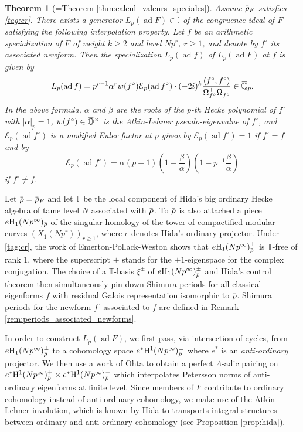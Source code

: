 \documentclass[12pt]{amsart}
\newcommand\bI{\mathbb{I}}
\newcommand\bQ{\mathbb{Q}}
\newcommand\bT{\mathbb{T}}
\newcommand\cE{\mathcal{E}}
\newcommand{\ob}[1]{\mkern 1.5mu\overline{\mkern-1.5mu#1\mkern-1.5mu}\mkern 1.5mu}
\DeclareMathOperator{\ad}{ad}
\newcommand{\HH}{\mathrm{H}}
\theoremstyle{defstyle}
\theoremstyle{thmstyle}
\newtheorem{THM}{Theorem}
\begin{document}
\begin{THM}[=Theorem \ref{thm:calcul_valeurs_speciales}]\label{thm:introduction_main_1}
	Assume $\ob{\rho}_F$ satisfies \eqref{tag:cr}. There exists a generator $L_p(\ad F)\in\bI$ of the congruence ideal of $F$ satisfying the following interpolation property. Let $f$ be an arithmetic specialization of $F$ of weight $k\geq 2$ and level $Np^r$, $r\geq 1$, and denote by $f^\circ$ its associated newform. Then the specialization $L_p(\ad f)$ of $L_p(\ad F)$ at $f$ is given by
	\begin{equation*}
		L_p(\ad f)=p^{r-1}\alpha^r w(f^\circ)\cE_p(\ad f^\circ)\cdot (-2i)^{k} \dfrac{\langle f^\circ,f^\circ\rangle}{\Omega^+_{f^\circ}\Omega^-_{f^\circ}}\in\ob{\bQ}_p.
	\end{equation*}
	In the above formula, $\alpha$ and $\beta$ are the roots of the $p$-th Hecke polynomial of $f^\circ$ with $|\alpha|_p=1$, $w(f^\circ)\in \ob{\bQ}^\times$ is the Atkin-Lehner pseudo-eigenvalue of $f^\circ$, and $\cE_p(\ad f^\circ)$ is a modified Euler factor at $p$ given by $\cE_p(\ad f^\circ)=1$ if $f^\circ= f$ and by \[\cE_p(\ad f^\circ)=\alpha(p-1)(1-\frac{\beta}{\alpha})(1-p^{-1}\frac{\beta}{\alpha}) \]
	if $f^\circ\neq f$.
\end{THM}
Let $\ob{\rho}=\ob{\rho}_F$ and let $\bT$ be the local component of Hida's big ordinary Hecke algebra of tame level $N$ associated with $\ob{\rho}$. 
To $\ob{\rho}$ is also attached a piece $e\HH_1(Np^\infty)_{\ob{\rho}}$ of the singular homology of the tower of compactified modular curves $(X_1(Np^r))_{r\geq 1}$, where $e$ denotes Hida's ordinary projector. 
Under \eqref{tag:cr}, the work of Emerton-Pollack-Weston  \cite{emerton2006variation} shows that $e\HH_1(Np^\infty)_{\ob{\rho}}^\pm$ is $\bT$-free of rank 1, where the superscript $\pm$ stands for the $\pm1$-eigenspace for the complex conjugation. 
The choice of a $\bT$-basis $\xi^\pm$ of $e\HH_1(Np^\infty)_{\ob{\rho}}^\pm$ and Hida's control theorem then simultaneously pin down Shimura periods for all classical eigenforms $f$ with residual Galois representation isomorphic to $\ob{\rho}$. Shimura periods for the newform $f^\circ$ associated to $f$ are defined in Remark \ref{rem:periods_associated_newforms}.

In order to construct $L_p(\ad F)$, we first pass, via intersection of cycles, from $e\HH_1(Np^\infty)_{\ob{\rho}}^\pm$ to a cohomology space $e^*\HH^1(Np^\infty)_{\ob{\rho}}^\pm$ where $e^*$ is an \emph{anti-ordinary} projector. We then use a work of Ohta \cite{ohtacrelle} to obtain a perfect $\Lambda$-adic pairing on  $e^*\HH^1(Np^\infty)_{\ob{\rho}}^+\times  e^*\HH^1(Np^\infty)_{\ob{\rho}}^-$ which interpolates Petersson norms of anti-ordinary eigenforms at finite level. 
Since members of $F$ contribute to ordinary cohomology instead of anti-ordinary cohomology, we make use of the Atkin-Lehner involution, which is known by Hida to
transports integral structures between ordinary and anti-ordinary cohomology (see Proposition \ref{prop:hida}).
\end{document}
